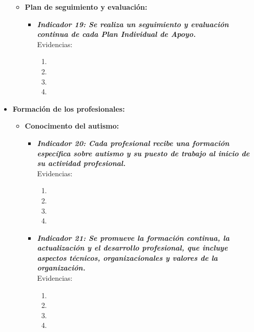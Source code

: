 \begin{itemize}
\begin{itemize}
\begin{itemize}
			
		 
		\end{itemize}
		\item \textbf{Plan de seguimiento y evaluación:}
		\begin{itemize}
			\item \textbf{\textit{Indicador 19: Se realiza un seguimiento y evaluación continua de cada Plan Individual de Apoyo.}}\\Evidencias:
			
			\begin{enumerate}
				\item 
				\item 
				\item 
				\item 
			\end{enumerate}
		\end{itemize}
	\end{itemize}
	\item \textbf{Formación de los profesionales:}
	\begin{itemize}
		\item \textbf{Conocimento del autismo:}
		\begin{itemize}
			\item \textbf{\textit{Indicador 20: Cada profesional recibe una formación específica sobre autismo y su puesto de trabajo al inicio de su actividad profesional.}}\\Evidencias:
			
			

			\begin{enumerate}
				\item 
				\item 
				\item 
				\item 
			\end{enumerate}

			\item \textbf{\textit{Indicador 21: Se promueve la formación continua, la actualización y el desarrollo profesional, que incluye aspectos técnicos, organizacionales y valores de la organización.}}\\Evidencias:
			
			

			\begin{enumerate}
				\item 
				\item 
				\item 
				\item 
			\end{enumerate}


\end{itemize}
\end{itemize}
\end{itemize}

